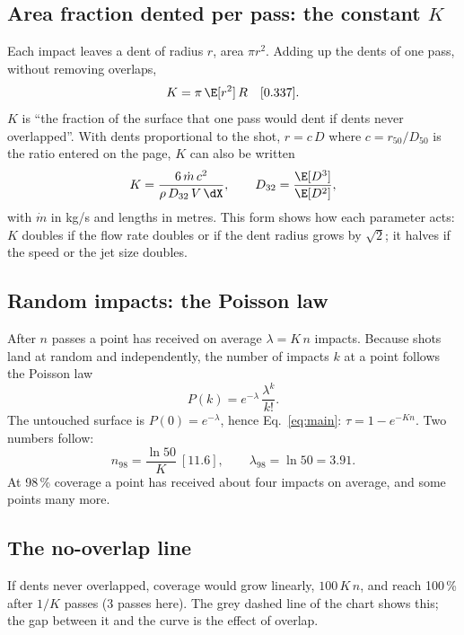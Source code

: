 \documentclass[11pt,a4paper]{article}
\begin{document}
\subsection{Area fraction dented per pass: the constant $K$}
Each impact leaves a dent of radius $r$, area $\pi r^2$. Adding up the dents of one pass, without removing overlaps,
\begin{equation}
K=\pi\,\E[r^2]\,R\quad[0.337].
\label{eq:K}
\end{equation}
$K$ is ``the fraction of the surface that one pass would dent if dents never overlapped''. With dents proportional to the shot, $r=c\,D$ where $c=r_{50}/D_{50}$ is the ratio entered on the page, $K$ can also be written
\begin{equation}
K=\frac{6\,\dot m\,c^2}{\rho\,D_{32}\,V\,\dX},\qquad D_{32}=\frac{\E[D^3]}{\E[D^2]},
\label{eq:Kalt}
\end{equation}
with $\dot m$ in kg/s and lengths in metres. This form shows how each parameter acts: $K$ doubles if the flow rate doubles or if the dent radius grows by $\sqrt2$; it halves if the speed or the jet size doubles.

\subsection{Random impacts: the Poisson law}
After $n$ passes a point has received on average $\lambda=K\,n$ impacts. Because shots land at random and independently, the number of impacts $k$ at a point follows the Poisson law
\begin{equation}
P(k)=e^{-\lambda}\,\frac{\lambda^k}{k!}.
\label{eq:poisson}
\end{equation}
The untouched surface is $P(0)=e^{-\lambda}$, hence Eq.~\eqref{eq:main}: $\tau=1-e^{-Kn}$. Two numbers follow:
\begin{equation}
n_{98}=\frac{\ln 50}{K}\ [11.6],\qquad \lambda_{98}=\ln 50=3.91.
\end{equation}
At 98\,\% coverage a point has received about four impacts on average, and some points many more.

\subsection{The no-overlap line}
If dents never overlapped, coverage would grow linearly, $100\,K\,n$, and reach 100\,\% after $1/K$ passes (3 passes here). The grey dashed line of the chart shows this; the gap between it and the curve is the effect of overlap.
\end{document}
